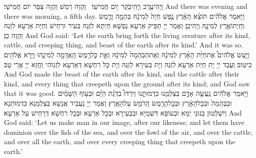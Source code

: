 {וַֽיְהִי\maqqaf עֶ֥רֶב וַֽיְהִי\maqqaf בֹ֖קֶר י֥וֹם חֲמִישִֽׁי׃ \petucha }
{וַהֲוָה רְמַשׁ וַהֲוָה צְפַר יוֹם חֲמִישָׁי׃}
{And there was evening and there was morning, a fifth day.}{}
{וַיֹּ֣אמֶר אֱלֹהִ֗ים תּוֹצֵ֨א הָאָ֜רֶץ נֶ֤פֶשׁ חַיָּה֙ לְמִינָ֔הּ בְּהֵמָ֥ה וָרֶ֛מֶשׂ וְחַֽיְתוֹ\maqqaf אֶ֖רֶץ לְמִינָ֑הּ וַֽיְהִי\maqqaf כֵֽן׃}
{וַאֲמַר יְיָ תַּפֵּיק אַרְעָא נַפְשָׁא חַיְתָא לִזְנַהּ בְּעִיר וּרְחֵישׁ וְחַיַּת אַרְעָא לִזְנַהּ וַהֲוָה כֵן׃}
{And God said: ‘Let the earth bring forth the living creature after its kind, cattle, and creeping thing, and beast of the earth after its kind.’ And it was so.}{}
{וַיַּ֣עַשׂ אֱלֹהִים֩ אֶת\maqqaf חַיַּ֨ת הָאָ֜רֶץ לְמִינָ֗הּ וְאֶת\maqqaf הַבְּהֵמָה֙ לְמִינָ֔הּ וְאֵ֛ת כׇּל\maqqaf רֶ֥מֶשׂ הָֽאֲדָמָ֖ה לְמִינֵ֑הוּ וַיַּ֥רְא אֱלֹהִ֖ים כִּי\maqqaf טֽוֹב׃}
{וַעֲבַד יְיָ יָת חַיַּת אַרְעָא לִזְנַהּ וְיָת בְּעִירָא לִזְנַהּ וְיָת כָּל רִחְשָׁא דְּאַרְעָא לִזְנוֹהִי וַחֲזָא יְיָ אֲרֵי טָב׃}
{And God made the beast of the earth after its kind, and the cattle after their kind, and every thing that creepeth upon the ground after its kind; and God saw that it was good.}{}
{וַיֹּ֣אמֶר אֱלֹהִ֔ים נַֽעֲשֶׂ֥ה אָדָ֛ם בְּצַלְמֵ֖נוּ כִּדְמוּתֵ֑נוּ וְיִרְדּוּ֩ בִדְגַ֨ת הַיָּ֜ם וּבְע֣וֹף הַשָּׁמַ֗יִם וּבַבְּהֵמָה֙ וּבְכׇל\maqqaf הָאָ֔רֶץ וּבְכׇל\maqqaf הָרֶ֖מֶשׂ הָֽרֹמֵ֥שׂ עַל\maqqaf הָאָֽרֶץ׃}
{וַאֲמַר יְיָ נַעֲבֵיד אֲנָשָׁא בְּצַלְמַנָא כִּדְמוּתַנָא וְיִשְׁלְטוּן בְּנוּנֵי יַמָּא וּבְעוֹפָא דִּשְׁמַיָּא וּבִבְעִירָא וּבְכָל אַרְעָא וּבְכָל רִחְשָׁא דְּרָחֵישׁ עַל אַרְעָא׃}
{And God said: ‘Let us make man in our image, after our likeness; and let them have dominion over the fish of the sea, and over the fowl of the air, and over the cattle, and over all the earth, and over every creeping thing that creepeth upon the earth.’}{}

